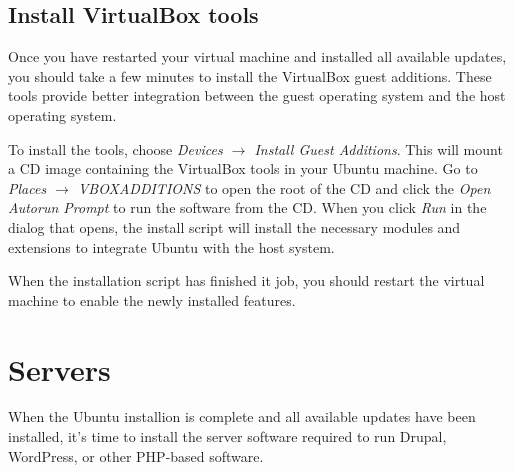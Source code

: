 \documentclass[ebook,10pt,twoside,openright]{memoir}
\begin{document}

\section{Install VirtualBox tools} \label{secinstallvirtualboxtools}

Once you have restarted your virtual machine and installed all available updates, you should take a few minutes to install the VirtualBox guest additions. These tools provide better integration between the guest operating system and the host operating system.

To install the tools, choose \emph{Devices $\rightarrow$ Install Guest Additions}. This will mount a CD image containing the VirtualBox tools in your Ubuntu machine. Go to \emph{Places $\rightarrow$ VBOXADDITIONS} to open the root of the CD and click the \emph{Open Autorun Prompt} to run the software from the CD. When you click \emph{Run} in the dialog that opens, the install script will install the necessary modules and extensions to integrate Ubuntu with the host system.

When the installation script has finished it job, you should restart the virtual machine to enable the newly installed features.


\chapter{Servers} \label{chservers}

\noindent
When the Ubuntu installion is complete and all available updates have been installed, it’s time to install the server software required to run Drupal, WordPress, or other PHP-based software.
\end{document}
